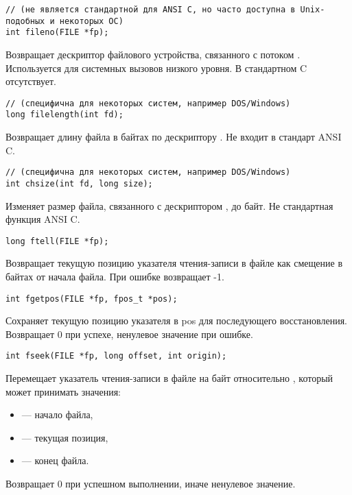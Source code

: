 \begin{verbatim}
// (не является стандартной для ANSI C, но часто доступна в Unix-подобных и некоторых ОС)
int fileno(FILE *fp);
\end{verbatim}
Возвращает дескриптор файлового устройства, связанного с потоком . Используется для системных вызовов низкого уровня. В стандартном C отсутствует.

\begin{verbatim}
// (специфична для некоторых систем, например DOS/Windows)
long filelength(int fd);
\end{verbatim}
Возвращает длину файла в байтах по дескриптору . Не входит в стандарт ANSI C.

\begin{verbatim}
// (специфична для некоторых систем, например DOS/Windows)
int chsize(int fd, long size);
\end{verbatim} 
Изменяет размер файла, связанного с дескриптором , до  байт. Не стандартная функция ANSI C.

\begin{verbatim}
long ftell(FILE *fp);
\end{verbatim}
Возвращает текущую позицию указателя чтения-записи в файле  как смещение в байтах от начала файла. При ошибке возвращает -1.

\begin{verbatim}
int fgetpos(FILE *fp, fpos_t *pos);
\end{verbatim}
Сохраняет текущую позицию указателя в pos для последующего восстановления. Возвращает 0 при успехе, ненулевое значение при ошибке.

\begin{verbatim}
int fseek(FILE *fp, long offset, int origin);
\end{verbatim}
Перемещает указатель чтения-записи в файле  на  байт относительно , который может принимать значения:
\begin{itemize}
\item {} --- начало файла,
\item {} --- текущая позиция,
\item {} --- конец файла.
\end{itemize}
Возвращает 0 при успешном выполнении, иначе ненулевое значение.


